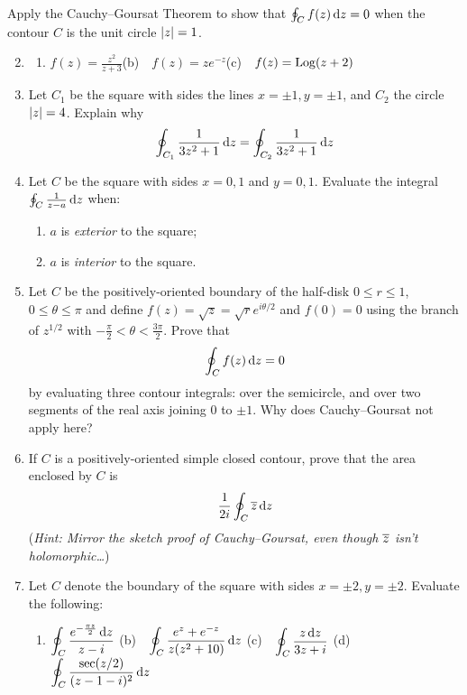 \begin{exercises}
	\exstart Apply the Cauchy--Goursat Theorem to show that $\oint_Cf(z)\,{\mathrm{d} z}=0$ when the contour $C$ is the unit circle $\left| z\right|=1$.
	\begin{enumerate}\setcounter{enumi}{1}
	  \item[]\begin{enumerate}
	    \item $\displaystyle f(z)=\frac{z^2}{z+3}$\qquad (b)\ \ $\displaystyle f(z)=ze^{-z}$\qquad (c)\ \ $\displaystyle f(z)=\operatorname{Log}(z+2)$
		\end{enumerate}
		
		
		\item Let $C_1$ be the square with sides the lines $x=\pm 1,y=\pm 1$, and $C_2$ the circle $\left| z\right|=4$. Explain why
		\[
			\oint_{C_1}\frac 1{3z^2+1}\,{\mathrm{d} z}=\oint_{C_2}\frac 1{3z^2+1}\,{\mathrm{d} z}
		\]
		
		
		\item Let $C$ be the square with sides $x=0,1$ and $y=0,1$. Evaluate the integral $\oint_C\frac 1{z-a}\,{\mathrm{d} z}$ when:
		\begin{enumerate}
		  \item $a$ is \emph{exterior} to the square;
		  \item $a$ is \emph{interior} to the square.
		\end{enumerate}
		
		
		\item Let $C$ be the positively-oriented boundary of the half-disk $0\le r\le 1$, $0\le\theta\le\pi$ and define $f(z)=\sqrt z=\sqrt re^{i\theta/2}$ and $f(0)=0$ using the branch of $z^{1/2}$ with $-\frac{\pi}2<\theta<\frac{3\pi}2$. Prove that
		\[
			\oint_Cf(z)\,{\mathrm{d} z}=0
		\]
		by evaluating three contour integrals: over the semicircle, and over two segments of the real axis joining 0 to $\pm 1$. Why does Cauchy--Goursat not apply here?
		
		\item If $C$ is a positively-oriented simple closed contour, prove that the area enclosed by $C$ is
		\[\frac 1{2i}\oint_C\overline{z}\,{\mathrm{d} z}\]
		(\emph{Hint: Mirror the sketch proof of Cauchy--Goursat, even though $\overline{z}$ isn't holomorphic\ldots})
		
		
	  \item Let $C$ denote the boundary of the square with sides $x=\pm 2,y=\pm 2$. Evaluate the following:
	  \begin{enumerate}
	    \item $\displaystyle\oint_C\frac{e^{-\frac{\pi z}2}\,{\mathrm{d} z}}{z-i}$\qquad 
	   	(b)\ \ $\displaystyle\oint_C\frac{e^z+e^{-z}}{z(z^2+10)}\,{\mathrm{d} z}$\qquad 
	   	(c)\ \ $\displaystyle\oint_C\frac{z\,{\mathrm{d} z}}{3z+i}$\qquad 
	   	(d)\ \ $\displaystyle\oint_C\frac{\sec(z/2)}{(z-1-i)^2}\,{\mathrm{d} z}$
	  \end{enumerate}
	  

\end{enumerate}
\end{exercises}

